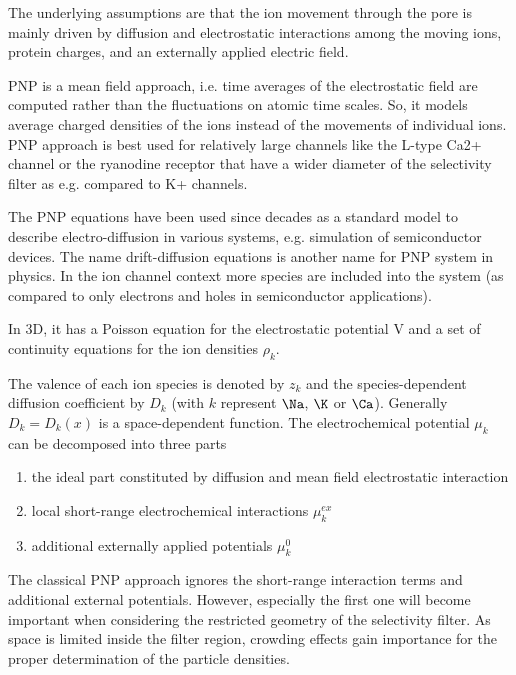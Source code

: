 The underlying assumptions are that the ion movement through the pore is mainly
driven by diffusion and electrostatic interactions among the moving ions,
protein charges, and an externally applied electric field.

PNP is a mean field approach, i.e. time averages of the electrostatic field are
computed rather than the fluctuations on atomic time scales. So, it models
average charged densities of the ions instead of the movements of individual
ions. PNP approach is best used for relatively large channels like the L-type
Ca2+ channel or the ryanodine receptor that have a wider diameter of the
selectivity filter as e.g. compared to K+ channels.

\begin{mdframed}

The PNP equations have been used since decades as a standard model to describe
electro-diffusion in various systems, e.g. simulation of semiconductor devices.
The name drift-diffusion equations is another name for PNP system in physics.
In the ion channel context more species are included into the system (as
compared to only electrons and holes in semiconductor applications).

In 3D, it has a Poisson equation for the electrostatic potential V and a set of
continuity equations for the ion densities $\rho_k$.

The valence of each ion species is denoted by $z_k$ and the species-dependent
diffusion coefficient by $D_k$ (with $k$ represent $\Na$, $\K$ or $\Ca$).
Generally $D_k = D_k(x)$ is a space-dependent
function. The electrochemical potential $\mu_k$ can be decomposed into three
parts
\begin{enumerate}
  \item  the ideal part constituted by diffusion and mean field electrostatic
  interaction

  \item local short-range electrochemical interactions $\mu_k^{ex}$


  \item additional
externally applied potentials $\mu_k^0$
\end{enumerate}

The classical PNP approach ignores the short-range interaction terms and
additional external potentials. However, especially the first one will become
important when considering the restricted geometry of the selectivity filter. As
space is limited inside the filter region, crowding effects gain importance for
the proper determination of the particle densities.

\end{mdframed}

